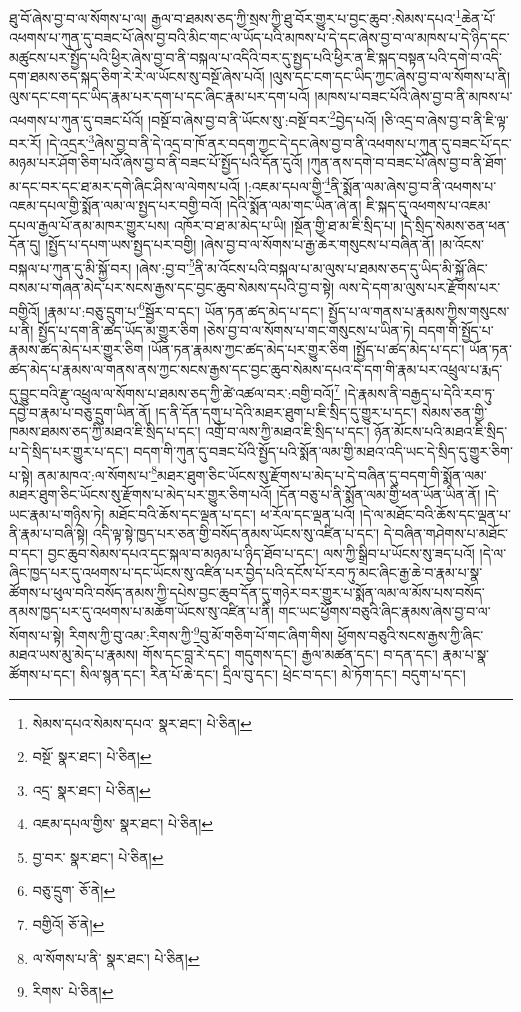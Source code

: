ཐུ་བོ་ཞེས་བྱ་བ་ལ་སོགས་པ་ལ། རྒྱལ་བ་ཐམས་ཅད་ཀྱི་སྲས་ཀྱི་ཐུ་བོར་གྱུར་པ་བྱང་ཆུབ་:སེམས་དཔའ་\footnote{སེམས་དཔའ་སེམས་དཔའ་  སྣར་ཐང་།  པེ་ཅིན། }ཆེན་པོ་འཕགས་པ་ཀུན་དུ་བཟང་པོ་ཞེས་བྱ་བའི་མིང་གང་ལ་ཡོད་པའི་མཁས་པ་དེ་དང་ཞེས་བྱ་བ་ལ་མཁས་པ་དེ་ཉིད་དང་མཚུངས་པར་སྤྱོད་པའི་ཕྱིར་ཞེས་བྱ་བ་ནི་བསྐལ་པ་འདིའི་བར་དུ་སྤྱད་པའི་ཕྱིར་ན་ཇི་སྐད་བསྟན་པའི་དགེ་བ་འདི་དག་ཐམས་ཅད་སྐད་ཅིག་རེ་རེ་ལ་ཡོངས་སུ་བསྔོ་ཞེས་པའོ། །ལུས་དང་ངག་དང་ཡིད་ཀྱང་ཞེས་བྱ་བ་ལ་སོགས་པ་ནི། ལུས་དང་ངག་དང་ཡིད་རྣམ་པར་དག་པ་དང་ཞིང་རྣམ་པར་དག་པའོ། །མཁས་པ་བཟང་པོའི་ཞེས་བྱ་བ་ནི་མཁས་པ་འཕགས་པ་ཀུན་དུ་བཟང་པོའོ། །བསྔོ་བ་ཞེས་བྱ་བ་ནི་ཡོངས་སུ་:བསྔོ་བར་\footnote{བསྔོ་  སྣར་ཐང་།  པེ་ཅིན། }བྱེད་པའོ། །ཅི་འདྲ་བ་ཞེས་བྱ་བ་ནི་ཇི་ལྟ་བར་རོ། །དེ་འདྲར་\footnote{འདྲ་  སྣར་ཐང་།  པེ་ཅིན། }ཞེས་བྱ་བ་ནི་དེ་འདྲ་བ་ཁོ་ནར་བདག་ཀྱང་དེ་དང་ཞེས་བྱ་བ་ནི་འཕགས་པ་ཀུན་དུ་བཟང་པོ་དང་མཉམ་པར་ཤོག་ཅིག་པའོ་ཞེས་བྱ་བ་ནི་བཟང་པོ་སྤྱོད་པའི་དོན་དུའོ། །ཀུན་ནས་དགེ་བ་བཟང་པོ་ཞེས་བྱ་བ་ནི་ཐོག་མ་དང་བར་དང་ཐ་མར་དགེ་ཞིང་ཤིས་ལ་ལེགས་པའོ། །:འཇམ་དཔལ་གྱི་\footnote{འཇམ་དཔལ་གྱིས་  སྣར་ཐང་།  པེ་ཅིན། }ནི་སྨོན་ལམ་ཞེས་བྱ་བ་ནི་འཕགས་པ་འཇམ་དཔལ་གྱི་སྨོན་ལམ་ལ་སྤྱད་པར་བགྱི་བའོ། །དེའི་སྨོན་ལམ་གང་ཡིན་ཞེ་ན། ཇི་སྐད་དུ་འཕགས་པ་འཇམ་དཔལ་རྒྱལ་པོ་ནམ་མཁར་གྱུར་པས། འཁོར་བ་ཐ་མ་མེད་པ་ཡི། །སྔོན་གྱི་ཐ་མ་ཇི་སྲིད་པ། །དེ་སྲིད་སེམས་ཅན་ཕན་དོན་དུ། །སྤྱོད་པ་དཔག་ཡས་སྤྱད་པར་བགྱི། །ཞེས་བྱ་བ་ལ་སོགས་པ་རྒྱ་ཆེར་གསུངས་པ་བཞིན་ནོ། །མ་འོངས་བསྐལ་པ་ཀུན་དུ་མི་སྐྱོ་བར། །ཞེས་:བྱ་བ་\footnote{བྱ་བར་  སྣར་ཐང་།  པེ་ཅིན། }ནི་མ་འོངས་པའི་བསྐལ་པ་མ་ལུས་པ་ཐམས་ཅད་དུ་ཡིད་མི་སྐྱོ་ཞིང་བསམ་པ་གཞན་མེད་པར་སངས་རྒྱས་དང་བྱང་ཆུབ་སེམས་དཔའི་བྱ་བ་སྟེ། ལས་དེ་དག་མ་ལུས་པར་རྫོགས་པར་བགྱིའོ། །རྣམ་པ་:བཅུ་དྲུག་པ་\footnote{བཅུ་དྲུག་  ཅོ་ནེ། }སྦྱོར་བ་དང་། ཡོན་ཏན་ཚད་མེད་པ་དང་། སྤྱོད་པ་ལ་གནས་པ་རྣམས་ཀྱིས་གསུངས་པ་ནི། སྤྱོད་པ་དག་ནི་ཚད་ཡོད་མ་གྱུར་ཅིག །ཅེས་བྱ་བ་ལ་སོགས་པ་གང་གསུངས་པ་ཡིན་ཏེ། བདག་གི་སྤྱོད་པ་རྣམས་ཚད་མེད་པར་གྱུར་ཅིག །ཡོན་ཏན་རྣམས་ཀྱང་ཚད་མེད་པར་གྱུར་ཅིག །སྤྱོད་པ་ཚད་མེད་པ་དང་། ཡོན་ཏན་ཚད་མེད་པ་རྣམས་ལ་གནས་ནས་ཀྱང་སངས་རྒྱས་དང་བྱང་ཆུབ་སེམས་དཔའ་དེ་དག་གི་རྣམ་པར་འཕྲུལ་པ་རྨད་དུ་བྱུང་བའི་རྫུ་འཕྲུལ་ལ་སོགས་པ་ཐམས་ཅད་ཀྱི་ཚེ་འཚལ་བར་:བགྱི་བའོ།\footnote{བགྱིའོ།  ཅོ་ནེ། } །དེ་རྣམས་ནི་བརྒྱད་པ་དེའི་རབ་ཏུ་དབྱེ་བ་རྣམ་པ་བཅུ་དྲུག་ཡིན་ནོ། །ད་ནི་དོན་དགུ་པ་དེའི་མཐར་ཐུག་པ་ཇི་སྲིད་དུ་གྱུར་པ་དང་། སེམས་ཅན་གྱི་ཁམས་ཐམས་ཅད་ཀྱི་མཐའ་ཇི་སྲིད་པ་དང་། འགྲོ་བ་ལས་ཀྱི་མཐའ་ཇི་སྲིད་པ་དང་། ཉོན་མོངས་པའི་མཐའ་ཇི་སྲིད་པ་དེ་སྲིད་པར་གྱུར་པ་དང་། བདག་གི་ཀུན་དུ་བཟང་པོའི་སྤྱོད་པའི་སྨོན་ལམ་གྱི་མཐའ་འདི་ཡང་དེ་སྲིད་དུ་གྱུར་ཅིག་པ་སྟེ། ནམ་མཁའ་:ལ་སོགས་པ་\footnote{ལ་སོགས་པ་ནི་  སྣར་ཐང་།  པེ་ཅིན། }མཐར་ཐུག་ཅིང་ཡོངས་སུ་རྫོགས་པ་མེད་པ་དེ་བཞིན་དུ་བདག་གི་སྨོན་ལམ་མཐར་ཐུག་ཅིང་ཡོངས་སུ་རྫོགས་པ་མེད་པར་གྱུར་ཅིག་པའོ། །དོན་བཅུ་པ་ནི་སྨོན་ལམ་གྱི་ཕན་ཡོན་ཡིན་ནོ། །དེ་ཡང་རྣམ་པ་གཉིས་ཏེ། མཐོང་བའི་ཆོས་དང་ལྡན་པ་དང་། ཕ་རོལ་དང་ལྡན་པའོ། །དེ་ལ་མཐོང་བའི་ཆོས་དང་ལྡན་པ་ནི་རྣམ་པ་བཞི་སྟེ། འདི་ལྟ་སྟེ་ཁྱད་པར་ཅན་གྱི་བསོད་ནམས་ཡོངས་སུ་འཛིན་པ་དང་། དེ་བཞིན་གཤེགས་པ་མཐོང་བ་དང་། བྱང་ཆུབ་སེམས་དཔའ་དང་སྐལ་བ་མཉམ་པ་ཉིད་ཐོབ་པ་དང་། ལས་ཀྱི་སྒྲིབ་པ་ཡོངས་སུ་ཟད་པའོ། །དེ་ལ་ཞིང་ཁྱད་པར་དུ་འཕགས་པ་དང་ཡོངས་སུ་འཛིན་པར་བྱེད་པའི་དངོས་པོ་རབ་ཏུ་མང་ཞིང་རྒྱ་ཆེ་བ་རྣམ་པ་སྣ་ཚོགས་པ་ཕུལ་བའི་བསོད་ནམས་ཀྱི་དཔེས་བྱང་ཆུབ་དོན་དུ་གཉེར་བར་གྱུར་པ་སྨོན་ལམ་ལ་མོས་པས་བསོད་ནམས་ཁྱད་པར་དུ་འཕགས་པ་མཆོག་ཡོངས་སུ་འཛིན་པ་ནི། གང་ཡང་ཕྱོགས་བཅུའི་ཞིང་རྣམས་ཞེས་བྱ་བ་ལ་སོགས་པ་སྟེ། རིགས་ཀྱི་བུ་འམ་:རིགས་ཀྱི་\footnote{རིགས་  པེ་ཅིན། }བུ་མོ་གཅིག་པོ་གང་ཞིག་གིས། ཕྱོགས་བཅུའི་སངས་རྒྱས་ཀྱི་ཞིང་མཐའ་ཡས་མུ་མེད་པ་རྣམས། གོས་དང་བླ་རེ་དང་། གདུགས་དང་། རྒྱལ་མཚན་དང་། བ་དན་དང་། རྣམ་པ་སྣ་ཚོགས་པ་དང་། སིལ་སྙན་དང་། རིན་པོ་ཆེ་དང་། དྲིལ་བུ་དང་། ཕྲེང་བ་དང་། མེ་ཏོག་དང་། བདུག་པ་དང་། 